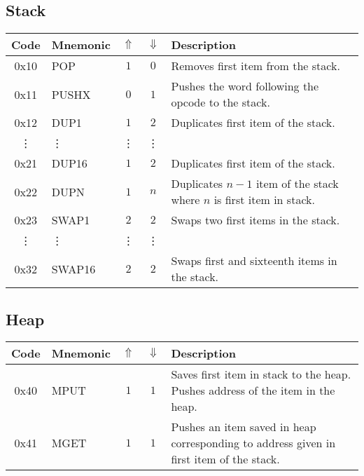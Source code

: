 \documentclass[12pt,a4paper]{article}
\begin{document}
\subsection{Stack}
\begin{tabularx}{\textwidth}{ c l c c p{7cm} }
\textbf{Code} & \textbf{Mnemonic} & \textbf{$\Uparrow$} & \textbf{$\Downarrow$} & \textbf{Description} \\
\hline
0x10 & POP & $1$ & $0$ & Removes first item from the stack. \\
\hline
0x11 & PUSHX & $0$ & $1$ & Pushes the word following the opcode to the stack. \\
\hline
0x12 & DUP1 & $1$ & $2$ & Duplicates first item of the stack. \\
\vdots & \vdots & \vdots & \vdots \\
0x21 & DUP16 & $1$ & $2$ & Duplicates first item of the stack. \\
\hline
0x22 & DUPN & $1$ & $n$ & Duplicates $n-1$ item of the stack where $n$ is first item in stack. \\
\hline
0x23 & SWAP1 & $2$ & $2$ & Swaps two first items in the stack. \\
\vdots & \vdots & \vdots & \vdots \\
0x32 & SWAP16 & $2$ & $2$ & Swaps first and sixteenth items in the stack. \\
\hline
\end{tabularx}

\subsection{Heap}
\begin{tabularx}{\textwidth}{ c l c c p{7cm} }
\textbf{Code} & \textbf{Mnemonic} & \textbf{$\Uparrow$} & \textbf{$\Downarrow$} & \textbf{Description} \\
\hline
0x40 & MPUT & $1$ & $1$ & Saves first item in stack to the heap. Pushes address of the item in the heap. \\
\hline
0x41 & MGET & $1$ & $1$ & Pushes an item saved in heap corresponding to address given in first item of the stack.  \\
\hline
\end{tabularx}
\end{document}
